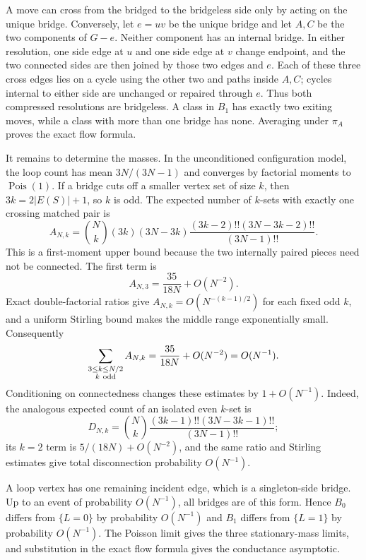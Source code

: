 \documentclass[11pt]{article}
\makeatletter
\theoremstyle{definition}
\renewenvironment{proof}[1][\proofname]{\par
  \pushQED{\qed}%
  \normalfont \topsep6\p@\@plus6\p@\relax
  \trivlist
  \item[\hskip\labelsep\bfseries #1\@addpunct{.}]\ignorespaces
}{%
  \popQED\endtrivlist\@endpefalse
}
\makeatother
\begin{document}
\begin{proof}
A move can cross from the bridged to the bridgeless side only by acting on the
unique bridge.  Conversely, let $e=uv$ be the unique bridge and let $A,C$ be
the two components of $G-e$.  Neither component has an internal bridge.  In
either resolution, one side edge at $u$ and one side edge at $v$ change
endpoint, and the two connected sides are then joined by those two edges and
$e$.  Each of these three cross edges lies on a cycle using the other two and
paths inside $A,C$; cycles internal to either side are unchanged or repaired
through $e$.  Thus both compressed resolutions are bridgeless.  A class in
$B_1$ has exactly two exiting moves, while a class with more than one bridge
has none.  Averaging under $\pi_A$ proves the exact flow formula.

It remains to determine the masses.  In the unconditioned configuration
model, the loop count has mean $3N/(3N-1)$ and converges by factorial moments
to $\operatorname{Pois}(1)$.  If a bridge cuts off a smaller vertex set of
size $k$, then $3k=2|E(S)|+1$, so $k$ is odd.  The expected number of
$k$-sets with exactly one crossing matched pair is
\[
 A_{N,k}=\binom Nk(3k)(3N-3k)
 \frac{(3k-2)!!(3N-3k-2)!!}{(3N-1)!!}.
\]
This is a first-moment upper bound because the two internally paired pieces
need not be connected.  The first term is
\[
 A_{N,3}=\frac{35}{18N}+O(N^{-2}).
\]
Exact double-factorial ratios give
$A_{N,k}=O(N^{-(k-1)/2})$ for each fixed odd $k$, and a uniform Stirling bound
makes the middle range exponentially small.  Consequently
\[
 \sum_{\substack{3\le k\le N/2\\k\ {\rm odd}}}A_{N,k}
 =\frac{35}{18N}+O(N^{-2})=O(N^{-1}).
\]
Conditioning on connectedness changes these estimates by $1+O(N^{-1})$.
Indeed, the analogous expected count of an isolated even $k$-set is
\[
 D_{N,k}=\binom Nk
 \frac{(3k-1)!!(3N-3k-1)!!}{(3N-1)!!};
\]
its $k=2$ term is $5/(18N)+O(N^{-2})$, and the same ratio and Stirling
estimates give total disconnection probability $O(N^{-1})$.

A loop vertex has one remaining incident edge, which is a singleton-side
bridge.  Up to an event of probability $O(N^{-1})$, all bridges are of this
form.  Hence $B_0$ differs from $\{L=0\}$ by probability $O(N^{-1})$ and
$B_1$ differs from $\{L=1\}$ by probability $O(N^{-1})$.  The Poisson limit
gives the three stationary-mass limits, and substitution in the exact flow
formula gives the conductance asymptotic.
\end{proof}
\end{document}
